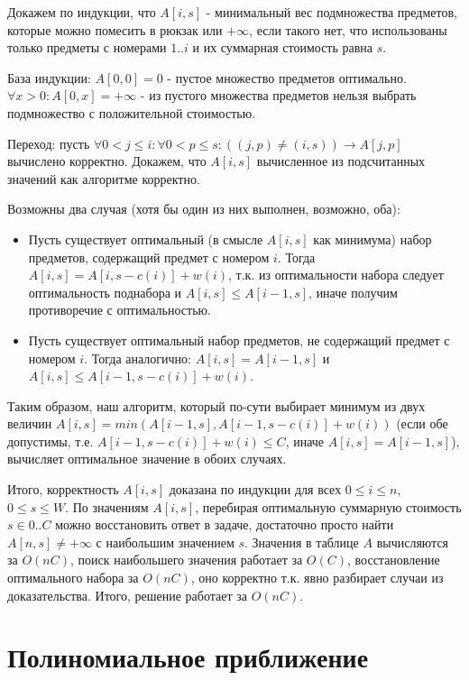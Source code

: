 \documentclass{article}
\begin{document}
	Докажем по индукции, что $A[i, s]$ - минимальный вес подмножества предметов, которые можно помесить в рюкзак или $+\infty$, если такого нет, что использованы только предметы с номерами $1..i$ и их суммарная стоимость равна $s$.
	
	База индукции: $A[0, 0] = 0$ - пустое множество предметов оптимально.
	$\forall x > 0: A[0, x] = +\infty$ - из пустого множества предметов нельзя выбрать подмножество с положительной стоимостью.
	
	Переход: пусть $\forall 0 < j \leq i: \forall 0 < p \leq s : ((j, p) \neq (i, s)) \rightarrow A[j, p]$ вычислено корректно. Докажем, что $A[i, s]$ вычисленное из подсчитанных значений как алгоритме корректно.
	
	Возможны два случая (хотя бы один из них выполнен, возможно, оба):
	
	\begin{itemize}
		\item 
	Пусть существует оптимальный (в смысле $A[i, s]$ как минимума) набор предметов, содержащий предмет с номером $i$. Тогда $A[i, s] = A[i, s - c(i)] + w(i)$, т.к. из оптимальности набора следует оптимальность поднабора и $A[i, s] \leq A[i - 1, s]$, иначе получим противоречие с оптимальностью.
	
		\item 
	Пусть существует оптимальный набор предметов, не содержащий предмет с номером $i$. Тогда аналогично: $A[i, s] = A[i-1, s]$ и $A[i, s] \leq A[i-1, s - c(i)] + w(i)$.
	
	\end{itemize}

	Таким образом, наш алгоритм, который по-сути выбирает минимум из двух величин $A[i, s] = min(A[i - 1, s], A[i - 1, s - c(i)] + w(i))$ (если обе допустимы, т.е. $A[i - 1, s - c(i)] + w(i) \leq C$, иначе $A[i, s] = A[i-1, s]$), вычисляет оптимальное значение в обоих случаях. 
	
	Итого, корректность $A[i, s]$ доказана по индукции для всех $ 0 \leq i \leq n$, $0 \leq s \leq W$. По значениям $A[i, s]$, перебирая оптимальную суммарную стоимость $s \in 0..C$ можно восстановить ответ в задаче, достаточно просто найти $A[n, s] \neq +\infty$ с наибольшим значением $s$. Значения в таблице $A$ вычисляются за $O(nC)$, поиск наибольшего значения работает за $O(C)$, восстановление оптимального набора за $O(nC)$, оно корректно т.к. явно разбирает случаи из доказательства. Итого, решение работает за $O(nC)$.
\section{Полиномиальное приближение}
\end{document}
